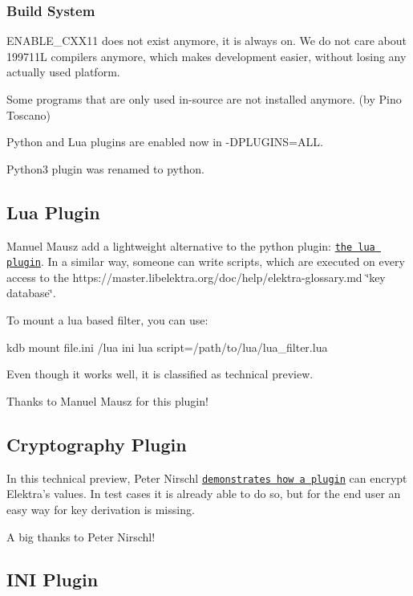 \subsubsection*{Build System}

E\+N\+A\+B\+L\+E\+\_\+\+C\+X\+X11 does not exist anymore, it is always on. We do not care about 199711L compilers anymore, which makes development easier, without losing any actually used platform.

Some programs that are only used in-\/source are not installed anymore. (by Pino Toscano)

Python and Lua plugins are enabled now in {\ttfamily -\/\+D\+P\+L\+U\+G\+I\+NS=A\+LL}.

Python3 plugin was renamed to python.

\subsection*{Lua Plugin}

Manuel Mausz add a lightweight alternative to the python plugin\+: \href{https://master.libelektra.org/src/plugins/lua/}{\tt the lua plugin}. In a similar way, someone can write scripts, which are executed on every access to the https\+://master.libelektra.\+org/doc/help/elektra-\/glossary.md \char`\"{}key database\char`\"{}.

To mount a lua based filter, you can use\+:


\begin{DoxyCode}
kdb mount file.ini /lua ini lua script=/path/to/lua/lua\_filter.lua
\end{DoxyCode}


Even though it works well, it is classified as technical preview.

Thanks to Manuel Mausz for this plugin!

\subsection*{Cryptography Plugin}

In this technical preview, Peter Nirschl \href{https://master.libelektra.org/src/plugins/crypto/}{\tt demonstrates how a plugin} can encrypt Elektra’s values. In test cases it is already able to do so, but for the end user an easy way for key derivation is missing.

A big thanks to Peter Nirschl!

\subsection*{I\+NI Plugin}

